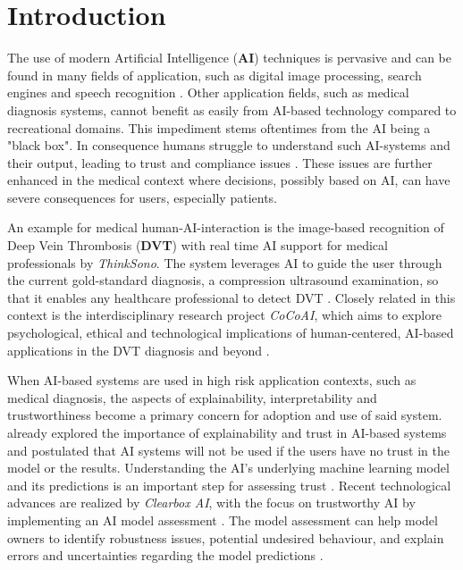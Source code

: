 \documentclass[11pt,a4paper,english]{scrreprt}
\begin{document}

\setlength{\parindent}{0em}
\setlength{\parskip}{1em}


\tableofcontents

\newpage
{}
\chapter{Introduction}
The use of modern Artificial Intelligence (\textbf{AI}) techniques is pervasive and can be found in many fields of application, such as digital image processing, search engines and speech recognition \parencite{eu_com_ai}. Other application fields, such as medical diagnosis systems, cannot benefit as easily from AI-based technology compared to recreational domains. This impediment stems oftentimes from the AI being a "black box". In consequence humans struggle to understand such AI-systems and their output, leading to trust and compliance issues \parencite{adadi_blackbox_2018}. These issues are further enhanced in the medical context where decisions, possibly based on AI, can have severe consequences for users, especially patients.

An example for medical human-AI-interaction is the image-based recognition of Deep Vein Thrombosis (\textbf{DVT}) with real time AI support for medical professionals by \textit{Think\-Sono}. The system leverages AI to guide the user through the current gold-standard diagnosis, a compression ultrasound examination, so that it enables any healthcare professional to detect DVT \parencite{thinksono_website}. Closely related in this context is the interdisciplinary research project \textit{CoCoAI}, which aims to explore psychological, ethical and technological implications of human-centered, AI-based applications in the DVT diagnosis and beyond \parencite{cocoai_website}. 

When AI-based systems are used in high risk application contexts, such as medical diagnosis, the aspects of explainability, interpretability and trustworthiness become a primary concern for adoption and use of said system. \textcite{ribeiro_why_2016} already explored the importance of explainability and trust in AI-based systems and postulated that AI systems will not be used if the users have no trust in the model or the results. Understanding the AI's underlying machine learning model and its predictions is an important step for assessing trust \parencite{ribeiro_why_2016}. Recent technological advances are realized by \textit{Clearbox AI}, with the focus on trustworthy AI by implementing an AI model assessment \parencite{clearbox_website, eu_trustworthy_ai}. The model assessment can help model owners to identify robustness issues, potential undesired behaviour, and explain errors and uncertainties regarding the model predictions \parencite{clearbox_wp}.
\end{document}
